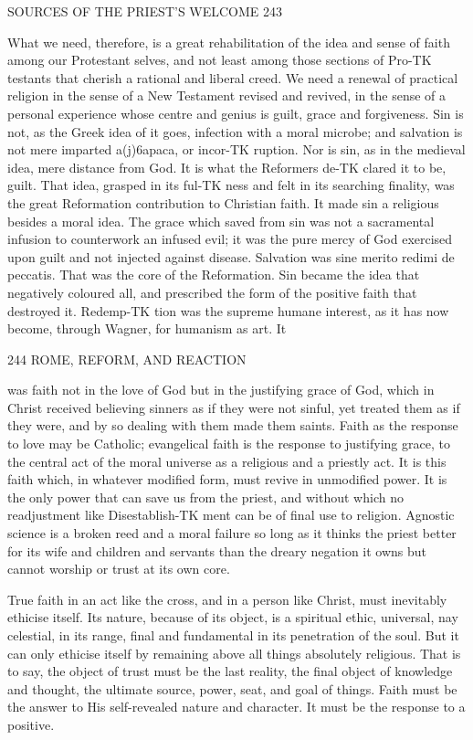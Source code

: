\documentclass[12pt,a5paper,oneside]{book}
\begin{document}
{SOURCES OF THE PRIEST'S WELCOME 243 



What we need, therefore, is a great rehabilitation 
of the idea and sense of faith among our Protestant 
selves, and not least among those sections of Pro-TK
testants that cherish a rational and liberal creed. We 
need a renewal of practical religion in the sense of a 
New Testament revised and revived, in the sense of 
a personal experience whose centre and genius is 
guilt, grace and forgiveness. Sin is not, as the Greek 
idea of it goes, infection with a moral microbe; and 
salvation is not mere imparted a(j)6apaca, or incor-TK
ruption. Nor is sin, as in the medieval idea, mere 
distance from God. It is what the Reformers de-TK
clared it to be, guilt. That idea, grasped in its ful-TK
ness and felt in its searching finality, was the great 
Reformation contribution to Christian faith. It made 
sin a religious besides a moral idea. The grace which 
saved from sin was not a sacramental infusion to 
counterwork an infused evil; it was the pure mercy 
of God exercised upon guilt and not injected against 
disease. Salvation was sine merito redimi de peccatis. 
That was the core of the Reformation. Sin became 
the idea that negatively coloured all, and prescribed the 
form of the positive faith that destroyed it. Redemp-TK
tion was the supreme humane interest, as it has now 
become, through Wagner, for humanism as art. It 



244 ROME, REFORM, AND REACTION 

was faith not in the love of God but in the justifying 
grace of God, which in Christ received believing 
sinners as if they were not sinful, yet treated them as 
if they were, and by so dealing with them made them 
saints. Faith as the response to love may be Catholic; 
evangelical faith is the response to justifying grace, 
to the central act of the moral universe as a religious 
and a priestly act. It is this faith which, in whatever 
modified form, must revive in unmodified power. It 
is the only power that can save us from the priest, 
and without which no readjustment like Disestablish-TK
ment can be of final use to religion. Agnostic 
science is a broken reed and a moral failure so long as 
it thinks the priest better for its wife and children 
and servants than the dreary negation it owns but 
cannot worship or trust at its own core. 

True faith in an act like the cross, and in a person 
like Christ, must inevitably ethicise itself. Its nature, 
because of its object, is a spiritual ethic, universal, 
nay celestial, in its range, final and fundamental in its 
penetration of the soul. But it can only ethicise itself 
by remaining above all things absolutely religious. 
That is to say, the object of trust must be the last 
reality, the final object of knowledge and thought, 
the ultimate source, power, seat, and goal of things. 
Faith must be the answer to His self-revealed nature 
and character. It must be the response to a positive. 



}
\end{document}
